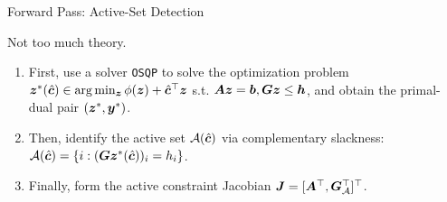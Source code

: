 \documentclass[10pt,aspectratio=169,xcolor=dvipsnames]{beamer}
\begin{document}
\begin{frame}{Forward Pass: Active-Set Detection}

    Not too much theory.

    \begin{enumerate}
        \item First, use a solver \texttt{OSQP} to solve the optimization problem ${\bm{z}}^*(\hat{{\bm{c}}}) \in \arg\min_{{\bm{z}}} \phi({\bm{z}}) + \hat{{\bm{c}}}^\top {\bm{z}}$ s.t. ${\bm{A}} {\bm{z}} = {\bm{b}}, {\bm{G}} {\bm{z}} \leq {\bm{h}}$, and obtain the primal-dual pair $({\bm{z}}^*,{\bm{y}}^*)$.
        \item Then, identify the active set $\mathcal{A}(\hat{{\bm{c}}})$ via complementary slackness: $\mathcal{A}(\hat{{\bm{c}}}) = \{i : ({\bm{G}} {\bm{z}}^*(\hat{{\bm{c}}}))_i = {h}_i\}$.
        \item Finally, form the active constraint Jacobian ${\bm{J}} = [{\bm{A}}^\top , {\bm{G}}_{\mathcal{A}}^\top]^\top$.

    \end{enumerate}

\end{frame}
\end{document}
